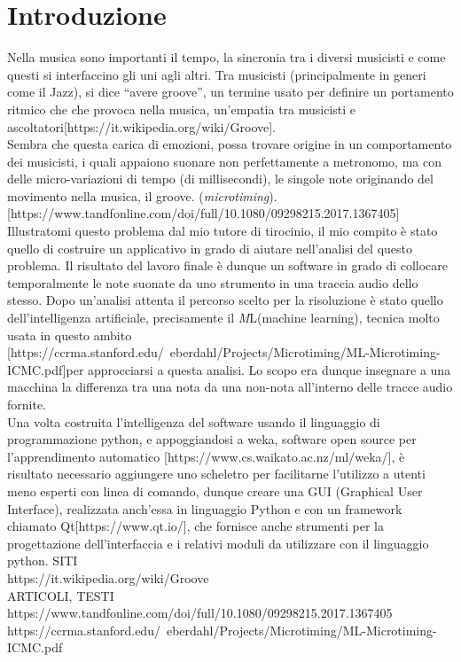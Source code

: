 \chapter*{Introduzione}
\label{cap:introduzione}
\rhead{\thepage}

\pagestyle{plain}
\fancyhf{}
\renewcommand{\headrulewidth}{2pt}
\fancyhead[EL]{\textbf{\textsf{\nouppercase\thepage}}}
\fancyhead[ER]{\textbf{\textsf{\nouppercase\leftmark}}}
\fancyhead[OR]{\textbf{\textsf{\nouppercase\thepage}}}
\fancyhead[OL]{\textbf{\textsf{\nouppercase {\rightmark}}}}

\thispagestyle{empty}

Nella musica sono importanti il tempo, la sincronia tra i diversi musicisti e come questi si interfaccino gli uni agli altri. Tra musicisti (principalmente in generi come il Jazz), si dice ``avere groove'', un termine usato per definire un portamento ritmico che che provoca nella musica, un'empatia tra musicisti e ascoltatori[https://it.wikipedia.org/wiki/Groove].\\
Sembra che questa carica di emozioni, possa trovare origine in un comportamento dei musicisti, i quali appaiono suonare non perfettamente a metronomo, ma con delle micro-variazioni di tempo (di millisecondi), le singole note originando del movimento nella musica, il groove. (\emph{microtiming}).[https://www.tandfonline.com/doi/full/10.1080/09298215.2017.1367405]\\
Illustratomi questo problema dal mio tutore di tirocinio, il mio compito è stato quello di costruire un applicativo in grado di aiutare nell'analisi del questo problema. Il risultato del lavoro finale è dunque un software in grado di collocare temporalmente le note suonate da uno strumento in una traccia audio dello stesso. Dopo un'analisi attenta il percorso scelto per la risoluzione è stato quello dell'intelligenza artificiale, precisamente il \emph{M}L(machine learning), tecnica molto usata in questo ambito [https://ccrma.stanford.edu/~eberdahl/Projects/Microtiming/ML-Microtiming-ICMC.pdf]per approcciarsi a questa analisi. Lo scopo era dunque insegnare a una macchina la differenza tra una nota da una non-nota all'interno delle tracce audio fornite.\\
Una volta costruita l'intelligenza del software usando il linguaggio di programmazione python, e appoggiandosi a weka, software open source per l'apprendimento automatico [https://www.cs.waikato.ac.nz/ml/weka/], è risultato necessario aggiungere uno scheletro per facilitarne l'utilizzo a utenti meno esperti con linea di comando, dunque creare una GUI (Graphical User Interface), realizzata anch'essa in linguaggio Python e con un framework chiamato Qt[https://www.qt.io/], che fornisce anche strumenti per la progettazione dell'interfaccia e i relativi moduli da utilizzare con il linguaggio python.
SITI\\
https://it.wikipedia.org/wiki/Groove\\

ARTICOLI, TESTI\\
https://www.tandfonline.com/doi/full/10.1080/09298215.2017.1367405\\
https://ccrma.stanford.edu/~eberdahl/Projects/Microtiming/ML-Microtiming-ICMC.pdf\\